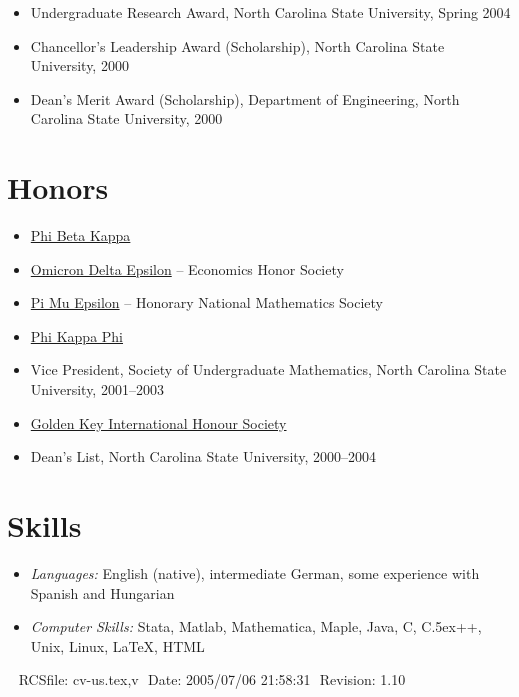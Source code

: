 \documentclass[overlapped,line,draft,11pt,letterpaper]{res}
\def\Cplusplus{{\rm C\raise.5ex\hbox{\small ++}}}
\begin{document}
\begin{resume}
\begin{itemize}
\item Undergraduate Research Award, North Carolina State University,
  Spring 2004
\item Chancellor's Leadership Award (Scholarship), North Carolina State
  University, 2000
\item Dean's Merit Award (Scholarship), Department of Engineering, North
  Carolina State University, 2000
\end{itemize}


\section{\bf Honors}
\begin{itemize}
\item \href{http://www.pbk.org/}{Phi Beta Kappa}
\item \href{http://www.cba.ua.edu/~ode/}
  {Omicron Delta Epsilon} -- Economics Honor Society
\item \href{http://www.pme-math.org/}
  {Pi Mu Epsilon} -- Honorary National Mathematics Society
\item \href{http://www.phikappaphi.org/}{Phi Kappa Phi}
\item Vice President, Society of Undergraduate Mathematics, North
  Carolina State University, 2001--2003
\item \href{http://www.goldenkey.org}{Golden Key International Honour Society}
\item Dean's List, North Carolina State University, 2000--2004
\end{itemize}


\section{\bf Skills}
\begin{itemize}
\item {\it Languages:} English (native), intermediate German,
  some experience with Spanish and Hungarian
\item {\it Computer Skills:} Stata, Matlab, Mathematica, Maple, Java, C,
  \Cplusplus, Unix, Linux, \LaTeX, HTML
\end{itemize}


\begin{center}
\vspace{\fill}\ \newline
{\tiny \rm $ $RCSfile: cv-us.tex,v $ $ }
{\tiny \rm $ $Date: 2005/07/06 21:58:31 $ $ }
{\tiny \rm $ $Revision: 1.10 $ $ }
\end{center}

\end{resume}
\end{document}
